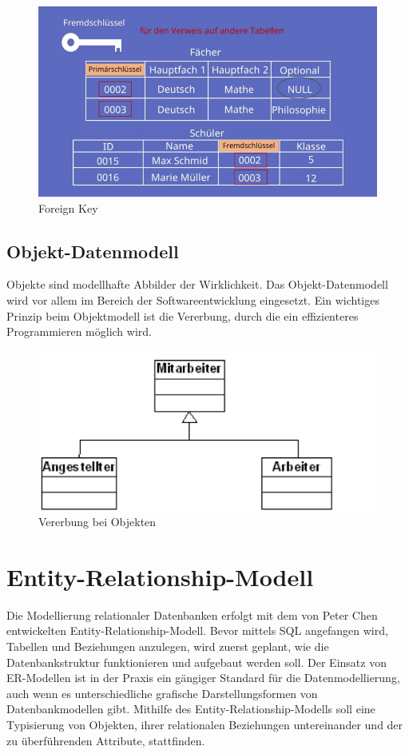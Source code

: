 \begin{figure}[h]
    \centering
    \includegraphics[width=.8\textwidth]{Content/images/modellierung/foreignkey.png}
    \caption{Foreign Key}
    \label{fig:modellierung:foreignkey}
\end{figure}

\subsection{Objekt-Datenmodell}

Objekte sind modellhafte Abbilder der Wirklichkeit. Das Objekt-Datenmodell wird vor allem im Bereich der Softwareentwicklung eingesetzt. Ein wichtiges Prinzip beim Objektmodell ist die Vererbung, durch die ein effizienteres Programmieren möglich wird.

\begin{figure}[h]
    \centering
    \includegraphics[width=.8\textwidth]{Content/images/modellierung/objekt.png}
    \caption{Vererbung bei Objekten}
    \label{fig:modellierung:objekt}
\end{figure}

\section{Entity-Relationship-Modell}

Die Modellierung relationaler Datenbanken erfolgt mit dem von Peter Chen entwickelten Entity-Relationship-Modell. Bevor mittels SQL angefangen wird, Tabellen und Beziehungen anzulegen, wird zuerst geplant, wie die Datenbankstruktur funktionieren und aufgebaut werden soll. Der Einsatz von ER-Modellen ist in der Praxis ein gängiger Standard für die Datenmodellierung, auch wenn es unterschiedliche grafische Darstellungsformen von Datenbankmodellen gibt.
Mithilfe des Entity-Relationship-Modells soll eine Typisierung von Objekten, ihrer relationalen Beziehungen untereinander und der zu überführenden Attribute, stattfinden.

